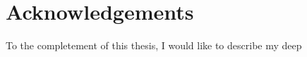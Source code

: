 \chapter*{Acknowledgements}
\thispagestyle{empty}

To the completement of this thesis, I would like to describe my deep

\clearpage
